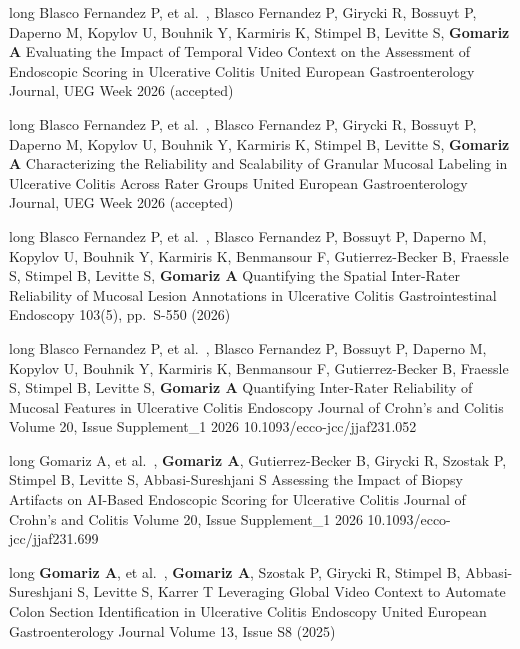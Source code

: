 \pagebreak
{}
\begin{cvpublications}
\cvpublication
{long}
{
    {Blasco Fernandez P, et al.~,}
    {Blasco Fernandez P, Girycki R, Bossuyt P, Daperno M, Kopylov U, Bouhnik Y, Karmiris K, Stimpel B, Levitte S, \textbf{Gomariz A}}
}
{Evaluating the Impact of Temporal Video Context on the Assessment of Endoscopic Scoring in Ulcerative Colitis}
{United European Gastroenterology Journal, UEG Week 2026 (accepted)}
{}
{}
{}

\cvpublication
{long}
{
    {Blasco Fernandez P, et al.~,}
    {Blasco Fernandez P, Girycki R, Bossuyt P, Daperno M, Kopylov U, Bouhnik Y, Karmiris K, Stimpel B, Levitte S, \textbf{Gomariz A}}
}
{Characterizing the Reliability and Scalability of Granular Mucosal Labeling in Ulcerative Colitis Across Rater Groups}
{United European Gastroenterology Journal, UEG Week 2026 (accepted)}
{}
{}
{}

\cvpublication
{long}
{
    {Blasco Fernandez P, et al.~,}
    {Blasco Fernandez P, Bossuyt P, Daperno M, Kopylov U, Bouhnik Y, Karmiris K, Benmansour F, Gutierrez-Becker B, Fraessle S, Stimpel B, Levitte S, \textbf{Gomariz A}}
}
{Quantifying the Spatial Inter-Rater Reliability of Mucosal Lesion Annotations in Ulcerative Colitis}
{Gastrointestinal Endoscopy}
{103(5), pp.\ S-550 (2026)}
{}
{}

\cvpublication
{long}
{
    {Blasco Fernandez P, et al.~,}
    {Blasco Fernandez P, Bossuyt P, Daperno M, Kopylov U, Bouhnik Y, Karmiris K, Benmansour F, Gutierrez-Becker B, Fraessle S, Stimpel B, Levitte S, \textbf{Gomariz A}}
}
{Quantifying Inter-Rater Reliability of Mucosal Features in Ulcerative Colitis Endoscopy}
{Journal of Crohn's and Colitis}
{Volume 20, Issue Supplement\_1}
{2026}
{10.1093/ecco-jcc/jjaf231.052}

\cvpublication
{long}
{
    {Gomariz A, et al.~,}
    {\textbf{Gomariz A}, Gutierrez-Becker B, Girycki R, Szostak P, Stimpel B, Levitte S, Abbasi-Sureshjani S}
}
{Assessing the Impact of Biopsy Artifacts on AI-Based Endoscopic Scoring for Ulcerative Colitis}
{Journal of Crohn's and Colitis}
{Volume 20, Issue Supplement\_1}
{2026}
{10.1093/ecco-jcc/jjaf231.699}

\cvpublication
{long}
{
    {\textbf{Gomariz A}, et al.~,}
    {\textbf{Gomariz A}, Szostak P, Girycki R, Stimpel B, Abbasi-Sureshjani S, Levitte S, Karrer T}
}
{Leveraging Global Video Context to Automate Colon Section Identification in Ulcerative Colitis Endoscopy}
{United European Gastroenterology Journal}
{Volume 13, Issue S8 (2025)}
{}
{}


\end{cvpublications}
